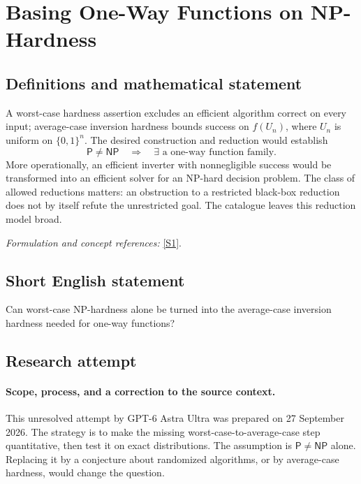 \documentclass[11pt]{article}
\begin{document}
\section*{\texorpdfstring{Basing One-Way Functions on NP-Hardness}{Basing One-Way Functions on NP-Hardness}}\label{33}
\subsection{Definitions and mathematical statement}
A worst-case hardness assertion excludes an efficient algorithm correct on every input; average-case inversion hardness bounds success on $f(U_n)$, where $U_n$ is uniform on $\{0,1\}^n$. The desired construction and reduction would establish
\[
 \mathsf P\ne\mathsf{NP}\quad\Longrightarrow\quad
 \exists\text{ a one-way function family}.
\]
More operationally, an efficient inverter with nonnegligible success would be transformed into an efficient solver for an NP-hard decision problem. The class of allowed reductions matters: an obstruction to a restricted black-box reduction does not by itself refute the unrestricted goal. The catalogue leaves this reduction model broad.
\par\smallskip\textit{Formulation and concept references:} \href{https://api.openalex.org/works/doi:10.1145/1132516.1132614}{[S1]}.

\subsection{Short English statement}
Can worst-case NP-hardness alone be turned into the average-case inversion hardness needed for one-way functions?
\subsection{Research attempt}

\paragraph{Scope, process, and a correction to the source context.}
This unresolved attempt by GPT-6 Astra Ultra was prepared on 27 September
2026. The strategy is to make the missing worst-case-to-average-case step
quantitative, then test it on exact distributions. The assumption is
$\mathsf P\ne\mathsf{NP}$ alone. Replacing it by a conjecture about randomized
algorithms, or by average-case hardness, would change the question.
\end{document}
